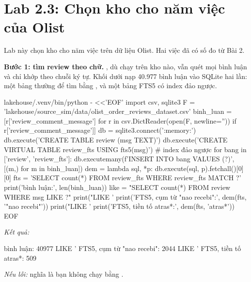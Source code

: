 \section{Lab 2.3: Chọn kho cho năm việc của Olist}

Lab này chọn kho cho năm việc trên dữ liệu Olist. Hai việc đã có số đo từ Bài 2.

\textbf{Bước 1: tìm review theo chữ.} , dù chạy trên kho nào, vẫn quét mọi bình luận và chỉ khớp theo chuỗi ký tự. Khối dưới nạp 40.977 bình luận vào SQLite hai lần: một bảng thường để tìm bằng , và một bảng FTS5 có index đảo ngược.

\begin{codeblock}
lakehouse/.venv/bin/python - <<'EOF'
import csv, sqlite3
F = 'lakehouse/source_sim/data/olist_order_reviews_dataset.csv'
binh_luan = [r['review_comment_message'] for r in csv.DictReader(open(F, newline=''))
             if r['review_comment_message']]
db = sqlite3.connect(':memory:')
db.execute('CREATE TABLE review (msg TEXT)')
db.execute('CREATE VIRTUAL TABLE review_fts USING fts5(msg)')  # index đảo ngược
for bang in ['review', 'review_fts']:
    db.executemany(f'INSERT INTO {bang} VALUES (?)', [(m,) for m in binh_luan])
dem = lambda sql, *p: db.execute(sql, p).fetchall()[0][0]
fts = 'SELECT count(*) FROM review_fts WHERE review_fts MATCH ?'
print('bình luận:', len(binh_luan))
like = "SELECT count(*) FROM review WHERE msg LIKE ?"
print("LIKE '%
print('FTS5, cụm từ "nao recebi":', dem(fts, '"nao recebi"'))
print("LIKE '%
print('FTS5, tiền tố atras*:', dem(fts, 'atras*'))
EOF
\end{codeblock}
\textit{Kết quả:}
\begin{codeblock}
bình luận: 40977
LIKE '%
FTS5, cụm từ "nao recebi": 2044
LIKE '%
FTS5, tiền tố atras*: 509
\end{codeblock}

\textit{Nếu lỗi:}  nghĩa là bạn không chạy bằng .

